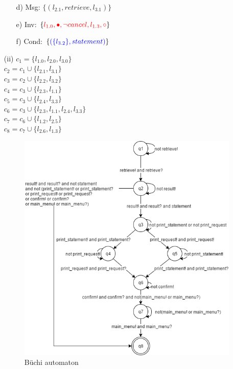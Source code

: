 \documentclass{scrartcl}
\begin{document}
\begin{itemize}
\begin{itemize}
		 	\item[d)] Msg: $ \{ (l_{2.1}, retrieve, l_{3.1}) \} $
		 	\item[e)] Inv: $ \{ {\color{red} l_{1.0}, \bullet, \neg cancel, l_{1.3}, \circ } \} $
		 	\item[f)] Cond: $ \{ {\color{blue} (\{ l_{3.2} \}, statement) } \} $
		\end{itemize}
		\pagebreak
		\item[(ii)] $ c_1 = \{ l_{1.0}, l_{2.0}, l_{3.0} \} $ \\
			$ c_2 = c_1 \cup \{ l_{2.1}, l_{3.1} \} $ \\
			$ c_3 = c_2 \cup \{ l_{2.2}, l_{3.2} \} $ \\
			$ c_4 = c_3 \cup \{ l_{2.3}, l_{1.1} \} $ \\
			$ c_5  = c_3 \cup \{ l_{2.4}, l_{3.3} \} $ \\
			$ c_6 = c_3 \cup \{ l_{2.3}, l_{1.1}, l_{2.4}, l_{3.3} \} $ \\
			$ c_7 = c_6 \cup \{ l_{1.2}, l_{2.5} \} $ \\
			$ c_8 = c_7 \cup \{ l_{2.6}, l_{1.3} \} $ \\
			
			\begin{figure}[h]
				\caption{Büchi automaton}
				\centering
				\includegraphics[width=\textwidth]{automaton.png}
			\end{figure}
		

\end{itemize}
\end{document}

